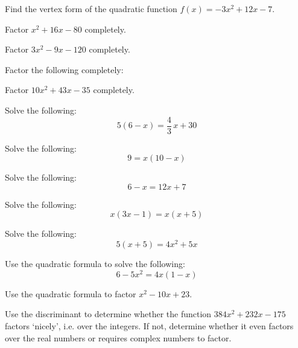 \documentclass[12pt,letterpaper]{exam}
\begin{document}
\begin{questions}
\newpage
\question[10] Find the vertex form of the quadratic function $f(x)= -3x^2 + 12x - 7$. 



\newpage
\question[10] Factor $x^2 + 16x - 80$ completely. 



\newpage
\question[10] Factor $3x^2 - 9x - 120$ completely. 



\newpage
\question Factor the following completely: \pspace




\newpage
\question[10] Factor $10x^2 + 43x - 35$ completely. 



\newpage
\question[10] Solve the following:
	\[
	5(6 - x)= \dfrac{4}{3}\,x + 30
	\]



\newpage
\question[10] Solve the following:
	\[
	9= x(10 - x)
	\]



\newpage
\question[10] Solve the following:
	\[
	6 - x= 12x + 7
	\]



\newpage
\question[10] Solve the following:
	\[
	x(3x - 1)= x(x + 5)
	\]



\newpage
\question[10] Solve the following:
	\[
	5(x + 5)= 4x^2 + 5x
	\]



\newpage
\question[10] Use the quadratic formula to solve the following:
	\[
	6 - 5x^2= 4x(1 - x)
	\]



\newpage
\question[10] Use the quadratic formula to factor $x^2 - 10x + 23$. 



\newpage
\question[10] Use the discriminant to determine whether the function $384x^2 + 232x - 175$ factors `nicely', i.e. over the integers. If not, determine whether it even factors over the real numbers or requires complex numbers to factor. 




\end{questions}
\end{document}
